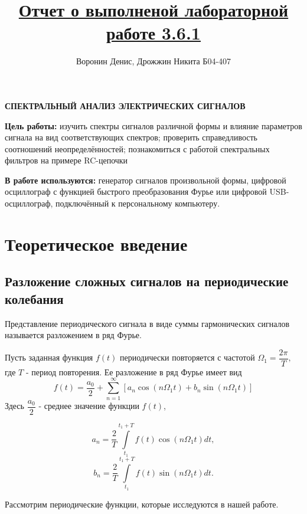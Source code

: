 \documentclass[a4paper]{article}
\title{\underline{Отчет о выполненой лабораторной работе 3.6.1}}
\author{Воронин Денис, Дрожжин Никита Б04-407}
\begin{document}
\maketitle

\begin{center}
\textbf{\Large СПЕКТРАЛЬНЫЙ АНАЛИЗ ЭЛЕКТРИЧЕСКИХ СИГНАЛОВ}
\end{center}


\indent \textbf{Цель работы:} изучить спектры сигналов различной формы и влияние параметров сигнала
на вид соответствующих спектров; проверить справедливость соотношений неопределённостей; познакомиться с работой спектральных фильтров на примере RC-цепочки

\indent \textbf{В работе используются:} генератор сигналов произвольной формы, цифровой осциллограф с функцией быстрого преобразования Фурье или цифровой USB-осциллограф, подключённый к персональному компьютеру.

\section{Теоретическое введение}

\subsection*{Разложение сложных сигналов на периодические колебания}
Представление периодического сигнала в виде суммы гармонических сигналов называется разложением в ряд Фурье.
	
	Пусть заданная функция $f(t)$ периодически повторяется с частотой $\Omega_{1}=\dfrac{2\pi}{T},$ где $T$ - период повторения. Ее разложение в ряд Фурье имеет вид
\begin{equation}
    f(t)=\dfrac{a_{0}}{2}+ \sum\limits_{n=1}^\infty [a_{n}\cos(n \Omega_{1}t)+b_{n}\sin(n \Omega_{1} t) ]
\label{eq1}
\end{equation}
		Здесь $\dfrac{a_{0}}{2}$ - среднее значение функции $f(t)$,
	
\begin{equation}
     a_{n}=\dfrac{2}{T}\int\limits_{t_{1}}^{t_{1}+T}f(t)\cos(n \Omega_{1} t)dt, 
     \label{eq2}
\end{equation}
\begin{equation}
    b_{n}=\dfrac{2}{T}\int\limits_{t_{1}}^{t_{1}+T}f(t)\sin(n \Omega_{1} t)dt.
    \label{eq3}
\end{equation}
  

	
	
	Рассмотрим периодические функции, которые исследуются в нашей
	работе.
	
\end{document}
